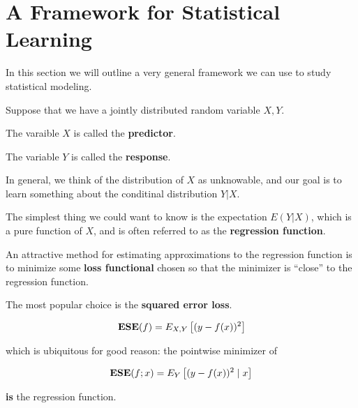 \section{A Framework for Statistical Learning}
%
%
\begin{frame}
  In this section we will outline a very general framework we can use to study
  statistical modeling.
\end{frame}
%
%
\begin{frame}
  Suppose that we have a jointly distributed random variable $X, Y$.

  The varaible $X$ is called the \textbf{predictor}.

  The variable $Y$ is called the \textbf{response}.
\end{frame}
%
%
\begin{frame}
  In general, we think of the distribution of $X$ as unknowable, and our goal is
  to learn something about the conditinal distribution $Y|X$.
\end{frame}
%
%
\begin{frame}
  The simplest thing we could want to know is the expectation $E(Y|X)$, which is
  a pure function of $X$, and is often referred to as the \textbf{regression
  function}.
\end{frame}
%
%
\begin{frame}
  An attractive method for estimating approximations to the regression function
  is to minimize some \textbf{loss functional} chosen so that the minimizer is
  ``close'' to the regression function.
\end{frame}
%
%
\begin{frame}
  The most popular choice is the \textbf{squared error loss}.  
  
  $$ \operatorname*{\mathbf{ESE}}(f) = E_{X, Y} \left[ (y - f(x))^2 \right] $$

  which is ubiquitous for good reason: the pointwise minimizer of
  
  $$ \operatorname*{\mathbf{ESE}}(f; x) = E_Y \left[ (y - f(x))^2 \mid x \right] $$
  
  \textbf{is} the regression function.
\end{frame}
%
%

